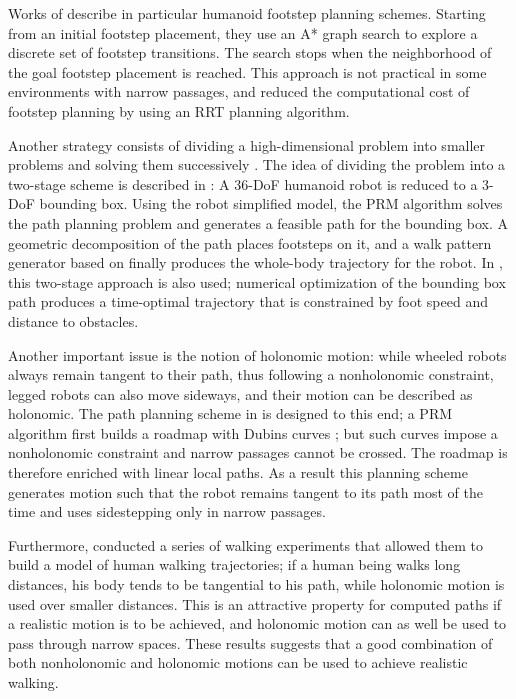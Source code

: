 Works of \cite{kuff01,ches05} describe in particular humanoid footstep
planning schemes. Starting from an initial footstep placement, they
use an A* graph search \cite{hart68} to explore a discrete set of
footstep transitions. The search stops when the neighborhood of the
goal footstep placement is reached. This approach is not practical in
some environments with narrow passages, and \cite{xia09} reduced the
computational cost of footstep planning by using an RRT planning
algorithm.

Another strategy consists of dividing a high-dimensional problem
into smaller problems and solving them successively \cite{zhan09}. The
idea of dividing the problem into a two-stage scheme is described in
\cite{yosh08}: A 36-DoF humanoid robot is reduced to a 3-DoF bounding
box. Using the robot simplified model, the PRM algorithm solves the
path planning problem and generates a feasible path for the bounding
box. A geometric decomposition of the path places footsteps on it, and
a walk pattern generator based on \cite{kaji03} finally produces the
whole-body trajectory for the robot. In \cite{moul10}, this two-stage
approach is also used; numerical optimization of the bounding box path
produces a time-optimal trajectory that is constrained by foot speed
and distance to obstacles.

Another important issue is the notion of holonomic motion: while
wheeled robots always remain tangent to their path, thus following a
nonholonomic constraint, legged robots can also move sideways, and
their motion can be described as holonomic. The path planning scheme
in \cite{yosh08} is designed to this end; a PRM algorithm first builds
a roadmap with Dubins curves \cite{dubi57}; but such curves impose a
nonholonomic constraint and narrow passages cannot be crossed. The
roadmap is therefore enriched with linear local paths. As a result
this planning scheme generates motion such that the robot remains
tangent to its path most of the time and uses sidestepping only in
narrow passages.

Furthermore, \cite{momb10} conducted a series of walking experiments
that allowed them to build a model of human walking trajectories; if a
human being walks long distances, his body tends to be tangential to
his path, while holonomic motion is used over smaller distances. This
is an attractive property for computed paths if a realistic motion is
to be achieved, and holonomic motion can as well be used to pass
through narrow spaces. These results suggests that a good combination
of both nonholonomic and holonomic motions can be used to achieve
realistic walking.

